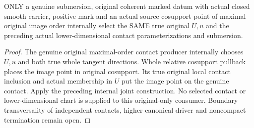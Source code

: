 \begin{theorem}
\label{hir:submersion-contact-parameters-original-only-consumer}
\leanok
ONLY a genuine submersion, original coherent marked datum with actual closed
smooth carrier, positive mark and an actual source cosupport point of maximal
original image order internally select the SAME true original $U,u$ and the
preceding actual lower-dimensional contact parameterizations and submersion.
\end{theorem}
\begin{proof}
The genuine original maximal-order contact producer internally chooses $U,u$
and both true whole tangent directions. Whole relative cosupport pullback
places the image point in original cosupport. Its true original local contact
inclusion and actual membership in $U$ put the image point on the genuine
contact. Apply the preceding internal joint construction. No selected contact
or lower-dimensional chart is supplied to this original-only consumer.
Boundary transversality of independent contacts, higher canonical driver and
noncompact termination remain open.
\end{proof}
